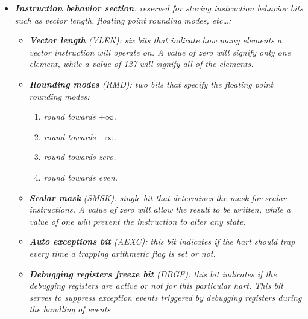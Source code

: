             \begin{itemize}

                \item \textit{\textbf{Instruction behavior section}: reserved for storing instruction behavior bits such as vector length, floating point rounding modes, etc\ldots:}

                    \begin{itemize}

                        \item \textit{\textbf{Vector length} (VLEN): six bits that indicate how many elements a vector instruction will operate on. A value of zero will signify only one element, while a value of 127 will signify all of the elements.}

                        \item \textit{\textbf{Rounding modes} (RMD): two bits that specify the floating point rounding modes:}

                            \begin{enumerate}

                                \item \textit{round towards \(+\infty\).}
                                \item \textit{round towards \(-\infty\).}
                                \item \textit{round towards zero.}
                                \item \textit{round towards even.}

                            \end{enumerate}

                        \item \textit{\textbf{Scalar mask} (SMSK): single bit that determines the mask for scalar instructions. A value of zero will allow the result to be written, while a value of one will prevent the instruction to alter any state.}

                        \item \textit{\textbf{Auto exceptions bit} (AEXC): this bit indicates if the hart should trap every time a trapping arithmetic flag is set or not.}

                        \item \textit{\textbf{Debugging registers freeze bit} (DBGF): this bit indicates if the debugging registers are active or not for this particular hart. This bit serves to suppress exception events triggered by debugging registers during the handling of events.}


\end{itemize}
\end{itemize}
